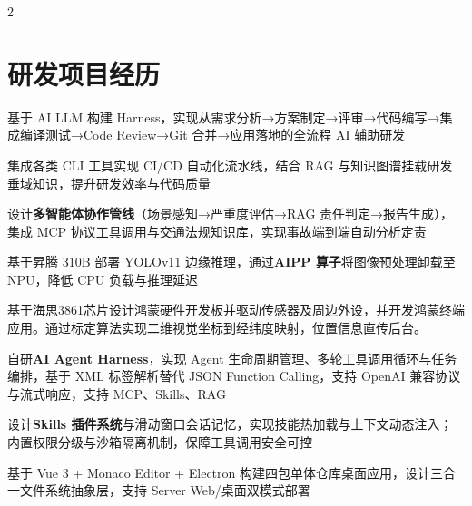\documentclass[]{deedy-resume-openfont}
\begin{document}
\begin{paracol}{2}

\section{研发项目经历}

\begin{tightemize}
    \item 基于 AI LLM 构建 Harness，实现从需求分析→方案制定→评审→代码编写→集成编译测试→Code Review→Git 合并→应用落地的全流程 AI 辅助研发
    \item 集成各类 CLI 工具实现 CI/CD 自动化流水线，结合 RAG 与知识图谱挂载研发垂域知识，提升研发效率与代码质量
\end{tightemize}
\sectionsep

\begin{tightemize}
    \item 设计\textbf{多智能体协作管线}（场景感知→严重度评估→RAG 责任判定→报告生成），集成 MCP 协议工具调用与交通法规知识库，实现事故端到端自动分析定责
    \item 基于昇腾 310B 部署 YOLOv11 边缘推理，通过\textbf{AIPP 算子}将图像预处理卸载至 NPU，降低 CPU 负载与推理延迟
    \item 基于海思3861芯片设计鸿蒙硬件开发板并驱动传感器及周边外设，并开发鸿蒙终端应用。通过标定算法实现二维视觉坐标到经纬度映射，位置信息直传后台。
\end{tightemize}
\sectionsep

\begin{tightemize}
    \item 自研\textbf{AI Agent Harness}，实现 Agent 生命周期管理、多轮工具调用循环与任务编排，基于 XML 标签解析替代 JSON Function Calling，支持 OpenAI 兼容协议与流式响应，支持 MCP、Skills、RAG
    \item 设计\textbf{Skills 插件系统}与滑动窗口会话记忆，实现技能热加载与上下文动态注入；内置权限分级与沙箱隔离机制，保障工具调用安全可控
    \item 基于 Vue 3 + Monaco Editor + Electron 构建四包单体仓库桌面应用，设计三合一文件系统抽象层，支持 Server Web/桌面双模式部署
\end{tightemize}
\sectionsep


\end{paracol}
\end{document}
